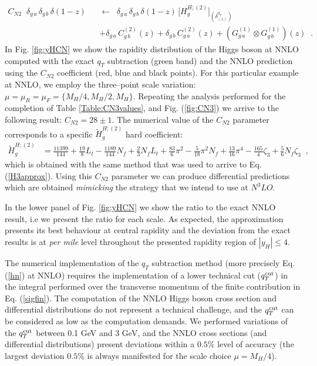 \documentclass[12pt]{article}
\def\beeq{\begin{eqnarray}}
\def\eeeq{\end{eqnarray}}
\def\nn{\nonumber}
\newcommand\f[2]{\frac{#1}{#2}}
\def\qt{q_T}
\begin{document}
\beeq
\label{CNeq}
C_{N2}\;\;\delta_{g\,a} \,\delta_{g\,b} \,\delta(1-z) && \!\!\!\!\!\! \leftarrow\;\; \delta_{g\,a} \,\delta_{g\,b} \,\delta(1-z)
\, \big[H^{H;(2)}_{g}\big]_{(\delta^{\qt}_{(1)})}\nn\\
&&+\delta_{g\,a} \,C^{(2)}_{g\,b}(z)+\delta_{g\,b} \,C^{(2)}_{g\,a}(z)+
\left(G^{(1)}_{g\,a}\otimes G^{(1)}_{g\,b}\right)(z)\;\; .
\eeeq 
In Fig. \ref{fig:yHCN} we show the rapidity distribution of the Higgs boson at NNLO computed with the exact $\qt$ subtraction (green band) and the NNLO prediction using the $C_{N2}$ coefficient (red, blue and black points). For this particular example at NNLO, we employ the three--point scale variation: $\mu=\mu_{R}=\mu_{F}=\{M_{H}/4,M_{H}/2,M_{H}\}$. Repeating the analysis performed for the completion of Table \ref{Table:CN3values}, and Fig. (\ref{fig:CN3}) we arrive to the following result: $C_{N2}=28\pm 1$. The numerical value of the $C_{N2}$ parameter corresponds to a specific $\widetilde{H}^{H;(2)}_{g}$ hard coefficient:
\begin{align}
\label{H2g}
\widetilde{H}^{H;(2)}_{g}&=\f{11399}{144}+\f{19}{8} L_{t}-\f{1189}{144} N_{f}+\f{2}{3} N_{f} L_{t}+\f{83}{6} \pi^{2} -\f{5}{18} \pi^{2} N_{f} + \f{13}{16} \pi^{4} - \f{165}{4} \zeta_{3} + \f{5}{6} N_{f} \zeta_{3}\;\;,
\end{align}
which is obtained with the same method that was used to arrive to Eq. (\ref{H3approx}).
Using this $C_{N2}$ parameter we can produce differential predictions which are obtained \textit{mimicking} the strategy that we intend to use at $N^{3}LO$. 

In the lower panel of Fig. \ref{fig:yHCN} we show the ratio to the exact NNLO result, i.e we present the ratio for each scale. As expected, the approximation presents its best behaviour at central rapidity and the deviation from the exact results is at \textit{per mile} level throughout the presented rapidity region of $|y_{H}|\leq 4$.

The numerical implementation of the $\qt$ subtraction method (more precisely Eq. (\ref{hn}) at NNLO) requires the implementation of a lower technical cut ($q_{T}^{\rm cut}$) in the integral performed over the transverse momentum of the finite contribution in Eq. (\ref{sigfin}). The computation of the NNLO Higgs boson cross section and differential distributions do not represent a technical challenge, and the $q_{T}^{\rm cut}$ can be considered as low as the computation demands. We performed variations of the $q_{T}^{\rm cut}$ between 0.1 GeV and 3 GeV, and the NNLO cross sections (and differential distributions) present deviations within a $0.5\%$ level of accuracy (the largest deviation $0.5\%$ is always manifested for the scale choice $\mu=M_{H}/4$).
\end{document}
